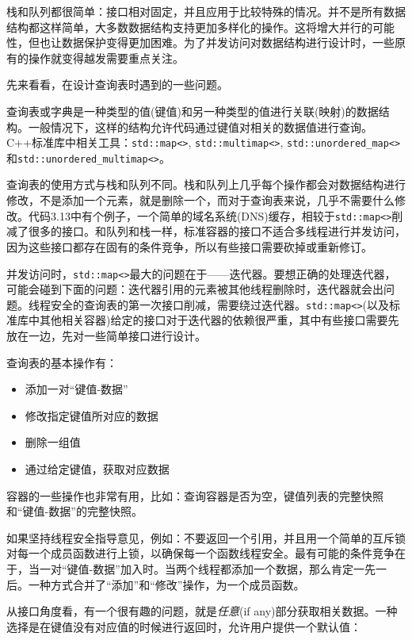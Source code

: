
栈和队列都很简单：接口相对固定，并且应用于比较特殊的情况。并不是所有数据结构都这样简单，大多数数据结构支持更加多样化的操作。这将增大并行的可能性，但也让数据保护变得更加困难。为了并发访问对数据结构进行设计时，一些原有的操作就变得越发需要重点关注。

先来看看，在设计查询表时遇到的一些问题。


查询表或字典是一种类型的值(键值)和另一种类型的值进行关联(映射)的数据结构。一般情况下，这样的结构允许代码通过键值对相关的数据值进行查询。C++标准库中相关工具：\texttt{std::map<>}, \texttt{std::multimap<>}, \texttt{std::unordered\_map<>}和\texttt{std::unordered\_multimap<>}。

查询表的使用方式与栈和队列不同。栈和队列上几乎每个操作都会对数据结构进行修改，不是添加一个元素，就是删除一个，而对于查询表来说，几乎不需要什么修改。代码3.13中有个例子，一个简单的域名系统(DNS)缓存，相较于\texttt{std::map<>}削减了很多的接口。和队列和栈一样，标准容器的接口不适合多线程进行并发访问，因为这些接口都存在固有的条件竞争，所以有些接口需要砍掉或重新修订。

并发访问时，\texttt{std::map<>}最大的问题在于——迭代器。要想正确的处理迭代器，可能会碰到下面的问题：迭代器引用的元素被其他线程删除时，迭代器就会出问题。线程安全的查询表的第一次接口削减，需要绕过迭代器。\texttt{std::map<>}(以及标准库中其他相关容器)给定的接口对于迭代器的依赖很严重，其中有些接口需要先放在一边，先对一些简单接口进行设计。

查询表的基本操作有：

\begin{itemize}
  \item 添加一对“键值-数据”
  \item 修改指定键值所对应的数据
  \item 删除一组值
  \item 通过给定键值，获取对应数据
\end{itemize}

容器的一些操作也非常有用，比如：查询容器是否为空，键值列表的完整快照和“键值-数据”的完整快照。

如果坚持线程安全指导意见，例如：不要返回一个引用，并且用一个简单的互斥锁对每一个成员函数进行上锁，以确保每一个函数线程安全。最有可能的条件竞争在于，当一对“键值-数据”加入时。当两个线程都添加一个数据，那么肯定一先一后。一种方式合并了“添加”和“修改”操作，为一个成员函数。

从接口角度看，有一个很有趣的问题，就是\textit{任意}(if any)部分获取相关数据。一种选择是在键值没有对应值的时候进行返回时，允许用户提供一个默认值：

